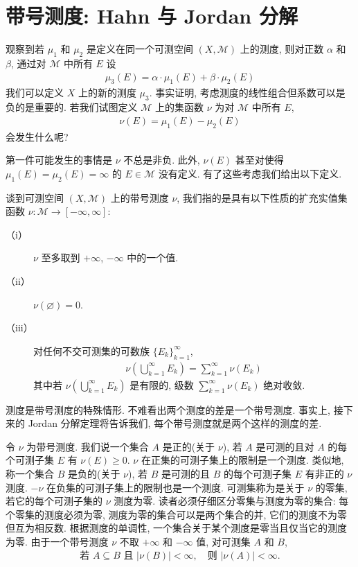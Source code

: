 \documentclass[../../main.tex]{subfiles}
\begin{document}
\section{带号测度: Hahn 与 Jordan 分解}\label{section:ch17-signed-measure}

观察到若 $\mu_{1}$ 和 $\mu_{2}$ 是定义在同一个可测空间 $(X,\mathcal{M})$ 上的测度, 则对正数 $\alpha$ 和 $\beta$, 通过对 $\mathcal{M}$ 中所有 $E$ 设
\begin{align*}
\mu_{3}(E)=\alpha\cdot\mu_{1}(E)+\beta\cdot\mu_{2}(E)
\end{align*}
我们可以定义 $X$ 上的新的测度 $\mu_{3}$. 事实证明, 考虑测度的线性组合但系数可以是负的是重要的. 若我们试图定义 $\mathcal{M}$ 上的集函数 $\nu$ 为对 $\mathcal{M}$ 中所有 $E$,
\begin{align*}
\nu(E)=\mu_{1}(E)-\mu_{2}(E)
\end{align*}
会发生什么呢?

第一件可能发生的事情是 $\nu$ 不总是非负. 此外, $\nu(E)$ 甚至对使得 $\mu_{1}(E)=\mu_{2}(E)=\infty$ 的 $E\in\mathcal{M}$ 没有定义. 有了这些考虑我们给出以下定义.

\begin{definition}[带号测度]\label{definition:ch17-signed-measure}
谈到可测空间 $(X,\mathcal{M})$ 上的带号测度 $\nu$, 我们指的是具有以下性质的扩充实值集函数 $\nu:\mathcal{M}\to[-\infty,\infty]$:
\begin{description}
\item[（i）] $\nu$ 至多取到 $+\infty$, $-\infty$ 中的一个值.
\item[（ii）] $\nu(\varnothing)=0$.
\item[（iii）] 对任何不交可测集的可数族 $\{E_{k}\}_{k=1}^{\infty}$,
\begin{align*}
\nu\left(\bigcup_{k=1}^{\infty}E_{k}\right)=\sum_{k=1}^{\infty}\nu(E_{k})
\end{align*}
其中若 $\nu\left(\bigcup_{k=1}^{\infty}E_{k}\right)$ 是有限的, 级数 $\sum_{k=1}^{\infty}\nu(E_{k})$ 绝对收敛.
\end{description}
\end{definition}

测度是带号测度的特殊情形. 不难看出两个测度的差是一个带号测度. 事实上, 接下来的 Jordan 分解定理将告诉我们, 每个带号测度就是两个这样的测度的差.

令 $\nu$ 为带号测度. 我们说一个集合 $A$ 是正的(关于 $\nu$), 若 $A$ 是可测的且对 $A$ 的每个可测子集 $E$ 有 $\nu(E)\geqslant 0$. $\nu$ 在正集的可测子集上的限制是一个测度. 类似地, 称一个集合 $B$ 是负的(关于 $\nu$), 若 $B$ 是可测的且 $B$ 的每个可测子集 $E$ 有非正的 $\nu$ 测度. $-\nu$ 在负集的可测子集上的限制也是一个测度. 可测集称为是关于 $\nu$ 的零集, 若它的每个可测子集的 $\nu$ 测度为零. 读者必须仔细区分零集与测度为零的集合: 每个零集的测度必须为零, 测度为零的集合可以是两个集合的并, 它们的测度不为零但互为相反数. 根据测度的单调性, 一个集合关于某个测度是零当且仅当它的测度为零. 由于一个带号测度 $\nu$ 不取 $+\infty$ 和 $-\infty$ 值, 对可测集 $A$ 和 $B$,
\begin{align}
\text{若 }A\subseteq B\text{ 且 }|\nu(B)|<\infty,\quad\text{则 }|\nu(A)|<\infty.\label{align:ch17-finite-monotonicity}
\end{align}
\end{document}

